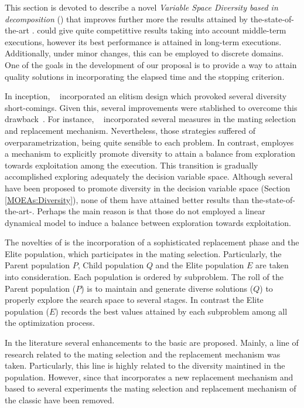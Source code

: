 This section is devoted to describe a novel \textit{Variable Space Diversity \MOEA{} based in decomposition} (\VSDMOEAD{}) that improves further more the results attained by the-state-of-the-art \MOEAS{}.
%
\VSDMOEAD{} could give quite competittive results taking into account middle-term executions, however its best performance is attained in long-term executions.
%
Additionally, under minor changes, this \MOEA{} can be employed to discrete domains.
%
One of the goals in the development of our proposal is to provide a way to attain quality solutions in \MOPS{} incorporating the elapsed time and the stopping criterion.


%
In inception, \MOEAD{}~\cite{zhang2007moea} incorporated an elitism design which provoked several diversity short-comings.
%
Given this, several improvements were stablished to overcome this drawback~\cite{trivedi2016survey}.
%
For instance, \MOEADDE{}~\cite{li2009multiobjective} incorporated several measures in the mating selection and replacement mechanism.
%
Nevertheless, those strategies suffered of overparametrization, being quite sensible to each problem.
%
In contrast, \VSDMOEAD{} employes a mechanism to explicitly promote diversity to attain a balance from exploration towards exploitation among the execution.
%
This transition is gradually accomplished exploring adequately the decision variable space.
%
Although several \MOEAS{} have been proposed to promote diversity in the decision variable space (Section \ref{MOEAs:Diversity}), none of them have attained better results than the-state-of-the-art-\MOEAS{}.
%
Perhaps the main reason is that those \MOEAS{} do not employed a linear dynamical model to induce a balance between exploration towards exploitation.
%


The novelties of \VSDMOEAD{} is the incorporation of a sophisticated replacement phase and the Elite population, which participates in the mating selection.
%
Particularly, the Parent population $P$, Child population $Q$ and the Elite population $E$ are taken into consideration.
%
Each population is ordered by subproblem.
%
The roll of the Parent population ($P$) is to maintain and generate diverse solutions ($Q$) to properly explore the search space to several stages.
%
In contrast the Elite population ($E$) records the best values attained by each subproblem among all the optimization process.
%

In the literature several enhancements to the basic \MOEAD{} are proposed.
%
Mainly, a line of research related to the mating selection and the replacement mechanism was taken.
%
Particularly, this line is highly related to the diversity maintined in the population.
%
However, since that \VSDMOEAD{} incorporates a new replacement mechanism and based to several experiments the mating selection and replacement mechanism of the classic \MOEAD{} have been removed.





